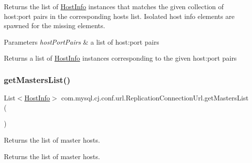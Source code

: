 Returns the list of \mbox{\hyperlink{classcom_1_1mysql_1_1cj_1_1conf_1_1_host_info}{Host\+Info}} instances that matches the given collection of host\+:port pairs in the corresponding hosts list. Isolated host info elements are spawned for the missing elements.


\begin{DoxyParams}{Parameters}
{\em host\+Port\+Pairs} & a list of host\+:port pairs \\
\hline
\end{DoxyParams}
\begin{DoxyReturn}{Returns}
a list of \mbox{\hyperlink{classcom_1_1mysql_1_1cj_1_1conf_1_1_host_info}{Host\+Info}} instances corresponding to the given host\+:port pairs 
\end{DoxyReturn}
\mbox{\label{classcom_1_1mysql_1_1cj_1_1conf_1_1url_1_1_replication_connection_url_aea588a641fe3e6352f0ca5c9940fc80a}} 
\subsubsection{\texorpdfstring{get\+Masters\+List()}{getMastersList()}}
{\footnotesize\ttfamily List$<$\mbox{\hyperlink{classcom_1_1mysql_1_1cj_1_1conf_1_1_host_info}{Host\+Info}}$>$ com.\+mysql.\+cj.\+conf.\+url.\+Replication\+Connection\+Url.\+get\+Masters\+List (\begin{DoxyParamCaption}{ }\end{DoxyParamCaption})}

Returns the list of master hosts.

\begin{DoxyReturn}{Returns}
the list of master hosts. 
\end{DoxyReturn}
\mbox{\label{classcom_1_1mysql_1_1cj_1_1conf_1_1url_1_1_replication_connection_url_a23e035f89d2356bf7939b354266efc3d}} 
